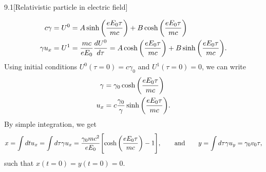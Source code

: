 \documentclass[12pt]{article}
\begin{document}
\begin{problem}{9.1}[Relativistic particle in electric field]
\begin{solution}
\begin{subequations}
    \begin{align}
        c\gamma=U^0
        &=A\sinh\qty(\frac{eE_0\tau}{mc})+B\cosh\qty(\frac{eE_0\tau}{mc}) \\
        \gamma u_x=U^1&
        =\frac{mc}{eE_0}\frac{dU^0}{d\tau}
        =A\cosh\qty(\frac{eE_0\tau}{mc})+B\sinh\qty(\frac{eE_0\tau}{mc}).
    \end{align} 
\end{subequations}
Using initial conditions $U^0(\tau=0)=c\gamma_0$ and $U^1(\tau=0)=0$, we can
write
\begin{subequations}
    \begin{align}
        \gamma&=\gamma_0\cosh\qty(\frac{eE_0\tau}{mc})\\
        u_x&=c\frac{\gamma_0}{\gamma}\sinh\qty(\frac{eE_0\tau}{mc}).
    \end{align}
\end{subequations}
By simple integration, we get
\begin{equation}
    x=\int dtu_x 
    =\int d\tau\gamma u_x
    =\frac{\gamma_0mc^2}{eE_0}\qty[\cosh\qty(\frac{eE_0\tau}{mc})-1],
    \qquad\text{and}\qquad
    y=\int d\tau \gamma u_y=\gamma_0v_0\tau,
\end{equation}
such that $x(t=0)=y(t=0)=0$.


\end{solution}
\end{problem}
\end{document}
